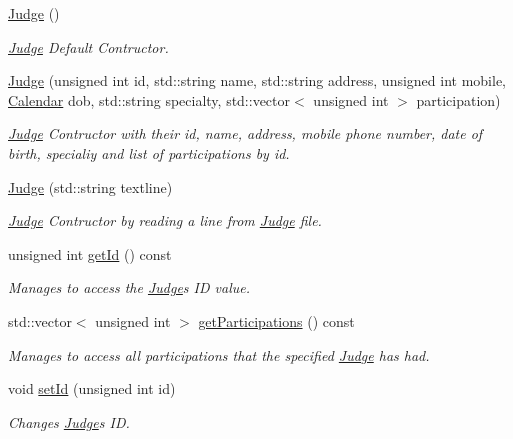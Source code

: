 \begin{DoxyCompactItemize}
\item 
\mbox{\label{class_judge_a76a14e0c72af67cb72152b6f176111cf}} 
\hyperlink{class_judge_a76a14e0c72af67cb72152b6f176111cf}{Judge} ()
\begin{DoxyCompactList}\small\item\em \hyperlink{class_judge}{Judge} Default Contructor. \end{DoxyCompactList}\item 
\hyperlink{class_judge_ad8e4c64a5b1cb72fc4f1f907117d97c3}{Judge} (unsigned int id, std\+::string name, std\+::string address, unsigned int mobile, \hyperlink{class_calendar}{Calendar} dob, std\+::string specialty, std\+::vector$<$ unsigned int $>$ participation)
\begin{DoxyCompactList}\small\item\em \hyperlink{class_judge}{Judge} Contructor with their id, name, address, mobile phone number, date of birth, specialiy and list of participations by id. \end{DoxyCompactList}\item 
\hyperlink{class_judge_a50775ff3e2a60d6c12893790e195a97e}{Judge} (std\+::string textline)
\begin{DoxyCompactList}\small\item\em \hyperlink{class_judge}{Judge} Contructor by reading a line from \hyperlink{class_judge}{Judge} file. \end{DoxyCompactList}\item 
unsigned int \hyperlink{class_judge_a1db442ff16710223a937fbeb7784c576}{get\+Id} () const
\begin{DoxyCompactList}\small\item\em Manages to access the \hyperlink{class_judge}{Judge}\textquotesingle{}s ID value. \end{DoxyCompactList}\item 
std\+::vector$<$ unsigned int $>$ \hyperlink{class_judge_aa854dfe7153ff301cba9319caeb3599c}{get\+Participations} () const
\begin{DoxyCompactList}\small\item\em Manages to access all participations that the specified \hyperlink{class_judge}{Judge} has had. \end{DoxyCompactList}\item 
void \hyperlink{class_judge_a06f4e2a65994b0e0a2e6aad38af0edea}{set\+Id} (unsigned int id)
\begin{DoxyCompactList}\small\item\em Changes \hyperlink{class_judge}{Judge}\textquotesingle{}s ID. \end{DoxyCompactList}\item 

\end{DoxyCompactItemize}

